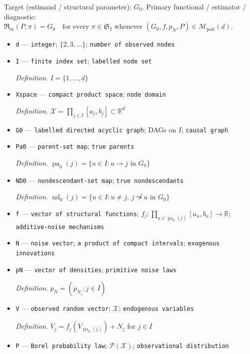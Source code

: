 \documentclass{article}
\begin{document}
Target (estimand / structural parameter): \(G_0\).
Primary functional / estimator / diagnostic: \(\mathfrak R_{\mathrm{or}}(P,\pi)=G_0\quad\text{for every }\pi\in\mathfrak S_I\text{ whenever }(G_0,f,p_N,P)\in\mathcal M_{\mathrm{pair}}(d)\).
\begin{itemize}
  \item \texttt{d} --- \texttt{integer}; \(\{2,3,\ldots\}\); \texttt{number of observed nodes}
  \item \texttt{I} --- \texttt{finite index set}; \texttt{labelled node set}
  \par\smallskip\noindent\emph{Definition.} \(I=\{1,\ldots,d\}\)
  \item \texttt{Xspace} --- \texttt{compact product space}; \texttt{node domain}
  \par\smallskip\noindent\emph{Definition.} \(\mathcal X=\prod_{j\in I}[a_j,b_j]\subset\mathbb R^d\)
  \item \texttt{G0} --- \texttt{labelled directed acyclic graph}; DAGs on \(I\); \texttt{causal graph}
  \item \texttt{Pa0} --- \texttt{parent-\allowbreak{}set map}; \texttt{true parents}
  \par\smallskip\noindent\emph{Definition.} \(\operatorname{pa}_0(j)=\{u\in I:u\to j\text{ in }G_0\}\)
  \item \texttt{ND0} --- \texttt{nondescendant-\allowbreak{}set map}; \texttt{true nondescendants}
  \par\smallskip\noindent\emph{Definition.} \(\operatorname{nd}_0(j)=\{u\in I:u\ne j,\ j\not\leadsto u\text{ in }G_0\}\)
  \item \texttt{f} --- \texttt{vector of structural functions}; \(f_j:\prod_{u\in\operatorname{pa}_0(j)}[a_u,b_u]\to\mathbb R\); \texttt{additive-\allowbreak{}noise mechanisms}
  \item \texttt{N} --- \texttt{noise vector}; \texttt{a product of compact intervals}; \texttt{exogenous innovations}
  \item \texttt{pN} --- \texttt{vector of densities}; \texttt{primitive noise laws}
  \par\smallskip\noindent\emph{Definition.} \(p_N=(p_{N_j}:j\in I)\)
  \item \texttt{V} --- \texttt{observed random vector}; \(\mathcal X\); \texttt{endogenous variables}
  \par\smallskip\noindent\emph{Definition.} \(V_j=f_j(V_{\operatorname{pa}_0(j)})+N_j\) for \(j\in I\)
  \item \texttt{P} --- \texttt{Borel probability law}; \(\mathcal P(\mathcal X)\); \texttt{observational distribution}

\end{itemize}
\end{document}

